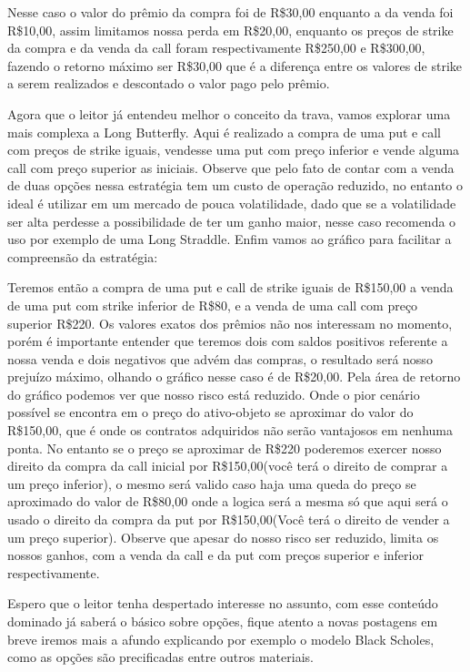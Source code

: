 \documentclass[]{book}
\theoremstyle{definition}
\theoremstyle{definition}
\theoremstyle{definition}
\theoremstyle{remark}
\begin{document}
Nesse caso o valor do prêmio da compra foi de R\$30,00 enquanto a da
venda foi R\$10,00, assim limitamos nossa perda em R\$20,00, enquanto os
preços de strike da compra e da venda da call foram respectivamente
R\$250,00 e R\$300,00, fazendo o retorno máximo ser R\$30,00 que é a
diferença entre os valores de strike a serem realizados e descontado o
valor pago pelo prêmio.

Agora que o leitor já entendeu melhor o conceito da trava, vamos
explorar uma mais complexa a Long Butterfly. Aqui é realizado a compra
de uma put e call com preços de strike iguais, vendesse uma put com
preço inferior e vende alguma call com preço superior as iniciais.
Observe que pelo fato de contar com a venda de duas opções nessa
estratégia tem um custo de operação reduzido, no entanto o ideal é
utilizar em um mercado de pouca volatilidade, dado que se a volatilidade
ser alta perdesse a possibilidade de ter um ganho maior, nesse caso
recomenda o uso por exemplo de uma Long Straddle. Enfim vamos ao gráfico
para facilitar a compreensão da estratégia:

Teremos então a compra de uma put e call de strike iguais de R\$150,00 a
venda de uma put com strike inferior de R\$80, e a venda de uma call com
preço superior R\$220. Os valores exatos dos prêmios não nos interessam
no momento, porém é importante entender que teremos dois com saldos
positivos referente a nossa venda e dois negativos que advém das
compras, o resultado será nosso prejuízo máximo, olhando o gráfico nesse
caso é de R\$20,00. Pela área de retorno do gráfico podemos ver que
nosso risco está reduzido. Onde o pior cenário possível se encontra em o
preço do ativo-objeto se aproximar do valor do R\$150,00, que é onde os
contratos adquiridos não serão vantajosos em nenhuma ponta. No entanto
se o preço se aproximar de R\$220 poderemos exercer nosso direito da
compra da call inicial por R\$150,00(você terá o direito de comprar a um
preço inferior), o mesmo será valido caso haja uma queda do preço se
aproximado do valor de R\$80,00 onde a logica será a mesma só que aqui
será o usado o direito da compra da put por R\$150,00(Você terá o
direito de vender a um preço superior). Observe que apesar do nosso
risco ser reduzido, limita os nossos ganhos, com a venda da call e da
put com preços superior e inferior respectivamente.

Espero que o leitor tenha despertado interesse no assunto, com esse
conteúdo dominado já saberá o básico sobre opções, fique atento a novas
postagens em breve iremos mais a afundo explicando por exemplo o modelo
Black Scholes, como as opções são precificadas entre outros materiais.
\end{document}
